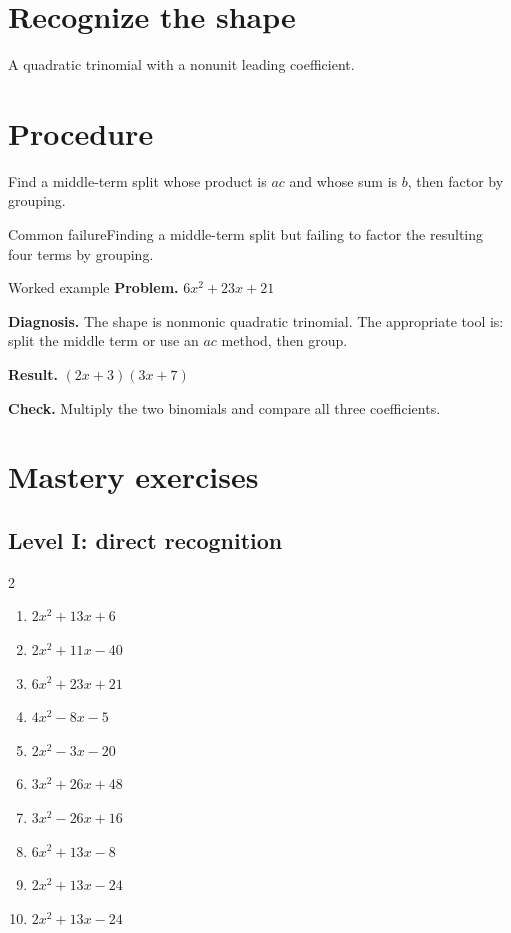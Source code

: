 \documentclass[11pt,oneside]{book}
\begin{document}
\section{Recognize the shape}
A quadratic trinomial with a nonunit leading coefficient.
\section{Procedure}
Find a middle-term split whose product is $ac$ and whose sum is $b$, then factor by grouping.

\begin{warningbox}{Common failure}Finding a middle-term split but failing to factor the resulting four terms by grouping.\end{warningbox}
\begin{examplebox}{Worked example}
\textbf{Problem.} $ 6 x^{2} + 23 x + 21 $

\textbf{Diagnosis.} The shape is nonmonic quadratic trinomial. The appropriate tool is: split the middle term or use an $ac$ method, then group.

\textbf{Result.} $ \left(2 x + 3\right) \left(3 x + 7\right) $

\textbf{Check.} Multiply the two binomials and compare all three coefficients.
\end{examplebox}
\section{Mastery exercises}
\subsection*{Level I: direct recognition}
\begin{multicols}{2}
\begin{enumerate}[leftmargin=*,label=\textbf{\arabic*.},itemsep=0.65\baselineskip]
\item $ 2 x^{2} + 13 x + 6 $
\item $ 2 x^{2} + 11 x - 40 $
\item $ 6 x^{2} + 23 x + 21 $
\item $ 4 x^{2} - 8 x - 5 $
\item $ 2 x^{2} - 3 x - 20 $
\item $ 3 x^{2} + 26 x + 48 $
\item $ 3 x^{2} - 26 x + 16 $
\item $ 6 x^{2} + 13 x - 8 $
\item $ 2 x^{2} + 13 x - 24 $
\item $ 2 x^{2} + 13 x - 24 $
\end{enumerate}
\end{multicols}
\end{document}
